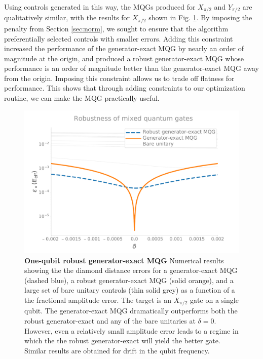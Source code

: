 \documentclass[aps,nofootinbib,pra,notitlepage,twocolumn]{revtex4-1}
\newcommand{\0}{\ensuremath{\mathbf{0}}}
\begin{document}
{Using controls generated in this way, the MQGs produced for $X_{\pi/2}$ and $Y_{\pi/2}$ are qualitatively similar, with the results for $X_{\pi/2}$ shown in Fig. \ref{fig:YMQG}. By imposing the penalty from Section \ref{sec:norm}, we sought to ensure that the algorithm preferentially selected controls with smaller errors. Adding this constraint increased the performance of the generator-exact MQG by nearly an order of magnitude at the origin, and produced a robust generator-exact MQG whose performance is an order of magnitude better than the generator-exact MQG away from the origin. Imposing this constraint allows us to trade off flatness for performance. This shows that through adding constraints to our optimization routine, we can make the MQG practically useful. 

\begin{figure}[h]
  \centering
  \includegraphics[width=\columnwidth]{1q_robustness_delta.pdf}
  \caption{\textbf{One-qubit robust generator-exact MQG} Numerical results showing the the diamond distance errors for a generator-exact MQG (dashed blue), a robust generator-exact MQG (solid orange), and a large set of bare unitary controls (thin solid grey) as a function of a the fractional amplitude error. The target is an $X_{\pi/2}$ gate on a single qubit. The generator-exact MQG dramatically outperforms both the robust generator-exact and any of the bare unitaries at $\delta=0$. However, even a relatively small amplitude error leads to a regime in which the the robust generator-exact will yield the better gate. Similar results are obtained for drift in the qubit frequency.}
  \label{fig:YMQG}
\end{figure}

}
\end{document}
